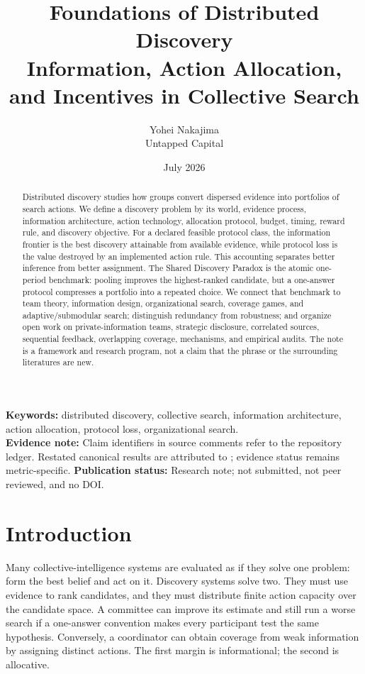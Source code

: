 \documentclass[11pt]{article}
\title{\textbf{Foundations of Distributed Discovery}\\[0.35em]
\large Information, Action Allocation, and Incentives in Collective Search}
\author{Yohei Nakajima\\{\normalsize Untapped Capital}}
\date{July 2026}
\theoremstyle{remark}
\begin{document}
\maketitle

\begin{abstract}
Distributed discovery studies how groups convert dispersed evidence into portfolios of search actions. We define a discovery problem by its world, evidence process, information architecture, action technology, allocation protocol, budget, timing, reward rule, and discovery objective. For a declared feasible protocol class, the information frontier is the best discovery attainable from available evidence, while protocol loss is the value destroyed by an implemented action rule. This accounting separates better inference from better assignment. The Shared Discovery Paradox is the atomic one-period benchmark: pooling improves the highest-ranked candidate, but a one-answer protocol compresses a portfolio into a repeated choice. We connect that benchmark to team theory, information design, organizational search, coverage games, and adaptive/submodular search; distinguish redundancy from robustness; and organize open work on private-information teams, strategic disclosure, correlated sources, sequential feedback, overlapping coverage, mechanisms, and empirical audits. The note is a framework and research program, not a claim that the phrase or the surrounding literatures are new.
\end{abstract}

\noindent\textbf{Keywords:} distributed discovery, collective search, information architecture, action allocation, protocol loss, organizational search.\\
\textbf{Evidence note:} Claim identifiers in source comments refer to the repository ledger. Restated canonical results are attributed to \citet{Nakajima2026SharedDiscovery}; evidence status remains metric-specific.
\textbf{Publication status:} Research note; not submitted, not peer reviewed, and no DOI.

\section{Introduction}
Many collective-intelligence systems are evaluated as if they solve one problem: form the best belief and act on it. Discovery systems solve two. They must use evidence to rank candidates, and they must distribute finite action capacity over the candidate space. A committee can improve its estimate and still run a worse search if a one-answer convention makes every participant test the same hypothesis. Conversely, a coordinator can obtain coverage from weak information by assigning distinct actions. The first margin is informational; the second is allocative.
\end{document}
